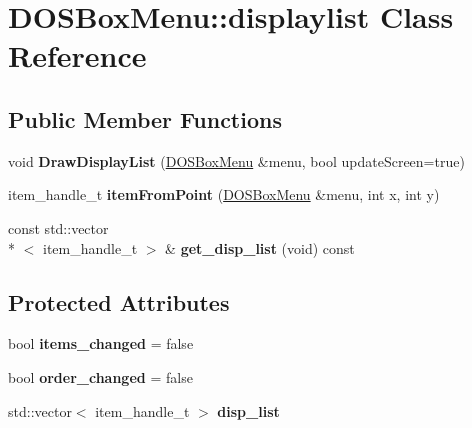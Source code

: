 \hypertarget{classDOSBoxMenu_1_1displaylist}{\section{D\-O\-S\-Box\-Menu\-:\-:displaylist Class Reference}
\label{classDOSBoxMenu_1_1displaylist}
}
\subsection*{Public Member Functions}
\begin{DoxyCompactItemize}
\item 
\hypertarget{classDOSBoxMenu_1_1displaylist_a78e620ffe855309f03662b0fa5928b82}{void {\bfseries Draw\-Display\-List} (\hyperlink{classDOSBoxMenu}{D\-O\-S\-Box\-Menu} \&menu, bool update\-Screen=true)}\label{classDOSBoxMenu_1_1displaylist_a78e620ffe855309f03662b0fa5928b82}

\item 
\hypertarget{classDOSBoxMenu_1_1displaylist_aa9e417c7ac2666eb33f7be2140c2e097}{item\-\_\-handle\-\_\-t {\bfseries item\-From\-Point} (\hyperlink{classDOSBoxMenu}{D\-O\-S\-Box\-Menu} \&menu, int x, int y)}\label{classDOSBoxMenu_1_1displaylist_aa9e417c7ac2666eb33f7be2140c2e097}

\item 
\hypertarget{classDOSBoxMenu_1_1displaylist_ab307b6046290be712c67392f56d7b4a8}{const std\-::vector\\*
$<$ item\-\_\-handle\-\_\-t $>$ \& {\bfseries get\-\_\-disp\-\_\-list} (void) const }\label{classDOSBoxMenu_1_1displaylist_ab307b6046290be712c67392f56d7b4a8}

\end{DoxyCompactItemize}
\subsection*{Protected Attributes}
\begin{DoxyCompactItemize}
\item 
\hypertarget{classDOSBoxMenu_1_1displaylist_a4240da9c5cf10b58da152a4afc4fb902}{bool {\bfseries items\-\_\-changed} = false}\label{classDOSBoxMenu_1_1displaylist_a4240da9c5cf10b58da152a4afc4fb902}

\item 
\hypertarget{classDOSBoxMenu_1_1displaylist_a6fdd2d35a71741ea750f565b316d97d1}{bool {\bfseries order\-\_\-changed} = false}\label{classDOSBoxMenu_1_1displaylist_a6fdd2d35a71741ea750f565b316d97d1}

\item 
\hypertarget{classDOSBoxMenu_1_1displaylist_acdb39094a8d29f3d0fbd67e4efc741e7}{std\-::vector$<$ item\-\_\-handle\-\_\-t $>$ {\bfseries disp\-\_\-list}}\label{classDOSBoxMenu_1_1displaylist_acdb39094a8d29f3d0fbd67e4efc741e7}

\end{DoxyCompactItemize}


